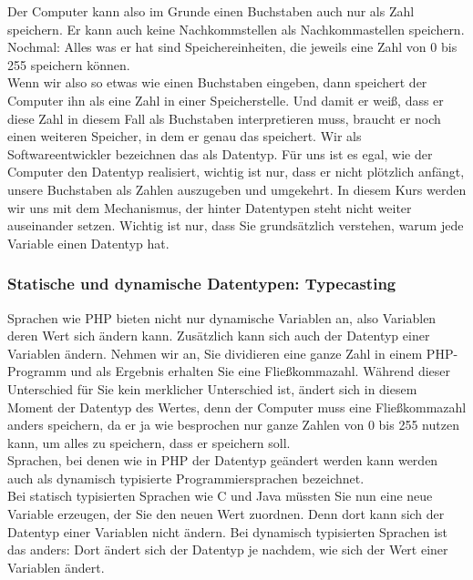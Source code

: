 Der Computer kann also im Grunde einen Buchstaben auch nur als Zahl speichern. Er kann auch keine Nachkommstellen als Nachkommastellen speichern. Nochmal: Alles was er hat sind Speichereinheiten, die jeweils eine Zahl von 0 bis 255 speichern können.\\


Wenn wir also so etwas wie einen Buchstaben eingeben, dann speichert der Computer ihn als eine Zahl in einer Speicherstelle. Und damit er weiß, dass er diese Zahl in diesem Fall als Buchstaben interpretieren muss, braucht er noch einen weiteren Speicher, in dem er genau das speichert. Wir als Softwareentwickler bezeichnen das als Datentyp. Für uns ist es egal, wie der Computer den Datentyp realisiert, wichtig ist nur, dass er nicht plötzlich anfängt, unsere Buchstaben als Zahlen auszugeben und umgekehrt. In diesem Kurs werden wir uns mit dem Mechanismus, der hinter Datentypen steht nicht weiter auseinander setzen. Wichtig ist nur, dass Sie grundsätzlich verstehen, warum jede Variable einen Datentyp hat.

\subsubsection{Statische und dynamische Datentypen: Typecasting}

Sprachen wie PHP bieten nicht nur dynamische Variablen an, also Variablen deren Wert sich ändern kann. Zusätzlich kann sich auch der Datentyp einer Variablen ändern. Nehmen wir an, Sie dividieren eine ganze Zahl in einem PHP-Programm und als Ergebnis erhalten Sie eine Fließkommazahl. Während dieser Unterschied für Sie kein merklicher Unterschied ist, ändert sich in diesem Moment der Datentyp des Wertes, denn der Computer muss eine Fließkommazahl anders speichern, da er ja wie besprochen nur ganze Zahlen von 0 bis 255 nutzen kann, um alles zu speichern, dass er speichern soll.\\

Sprachen, bei denen wie in PHP der Datentyp geändert werden kann werden auch als dynamisch typisierte Programmiersprachen bezeichnet.\\

Bei statisch typisierten Sprachen wie C und Java müssten Sie nun eine neue Variable erzeugen, der Sie den neuen Wert zuordnen. Denn dort kann sich der Datentyp einer Variablen nicht ändern. Bei dynamisch typisierten Sprachen ist das anders: Dort ändert sich der Datentyp je nachdem, wie sich der Wert einer Variablen ändert.\\

